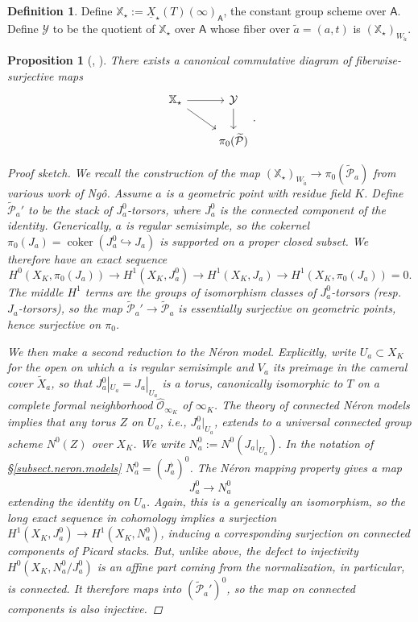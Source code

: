 \documentclass[openany]{amsbook}
\newtheorem{proposition}[theorem]{Proposition}
\theoremstyle{definition}
\newtheorem{definition}[theorem]{Definition}
\theoremstyle{remark}
\numberwithin{equation}{section}
\renewcommand{\O}{\mathcal{O}}
\newcommand{\cY}{\mathcal{Y}}
\newcommand{\cP}{\mathcal{P}}
\newcommand{\ul}[1]{\underline{#1}}
\newcommand{\coker}{\operatorname{coker}}
\renewcommand{\-}{\operatorname{-}}
\newcommand{\wtilde}[1]{\widetilde{#1}}
\newcommand{\ctP}{\widetilde{\cP}}
\newcommand{\bA}{\mathsf{A}}
\newcommand{\bX}{\mathbb{X}}
\begin{document}
\begin{definition}\label{def.Wa.coinvar.sheaf}
    Define $\bX_\star := \ul{X}_\star(T)(\infty)_{\bA}$, the constant group scheme over $\bA$. Define $\cY$ to be the quotient of $\bX_\star$ over $\bA$ whose fiber over $\wtilde{a} = (a,t)$ is $(\bX_\star)_{W_{\wtilde{a}}}$.
\end{definition}

\begin{proposition}[{{\cite[\S 5.5]{ngofl}, \cite[6.3-6.7]{ngoendo}}}]\label{prop.ngo.cpt.map}
     There exists a canonical commutative diagram of fiberwise-surjective maps
    $$
        \begin{tikzcd}[ampersand replacement=\&]
        \bX_\star \ar[r] \ar[dr]\& \cY \ar[d] \\
        \& \pi_0(\ctP)
        \end{tikzcd}.
    $$
    \begin{proof}[Proof sketch]
        We recall the construction of the map $(\bX_\star)_{W_{\wtilde{a}}} \to \pi_0(\ctP_a)$ from various work of Ng\^{o}. Assume $a$ is a geometric point with residue field $K$. Define $\ctP_a'$ to be the stack of $J_a^0$-torsors, where $J_a^0$ is the connected component of the identity. Generically, $a$ is regular semisimple, so the cokernel $\pi_0(J_a) = \coker(J_a^0 \hookrightarrow J_a)$ is supported on a proper closed subset. We therefore have an exact sequence
        $$
            H^0(X_K, \pi_0(J_a)) \to H^1(X_K, J_a^0) \to H^1(X_K, J_a) \to H^1(X_K, \pi_0(J_a)) = 0.
        $$
        The middle $H^1$ terms are the groups of isomorphism classes of $J_a^0$-torsors (resp. $J_a$-torsors), so the map $\ctP_a' \to \ctP_a$ is essentially surjective on geometric points, hence surjective on $\pi_0$. 
        
        We then make a second reduction to the N\'{e}ron model. Explicitly, write $U_a \subset X_K$ for the open on which $a$ is regular semisimple and $V_a$ its preimage in the cameral cover $\wtilde{X}_a$, so that $J_a^0|_{U_a} = J_a|_{U_a}$ is a torus, canonically isomorphic to $T$ on a complete formal neighborhood $\widehat{\O}_{\infty_K}$ of $\infty_K$. The theory of connected N\'{e}ron models implies that any torus $Z$ on $U_a$, i.e., $J_a^0|_{U_a}$, extends to a universal connected group scheme $N^0(Z)$ over $X_K$.
        We write $N_a^0 := N^0(J_a|_{U_a})$. In the notation of \S \ref{subsect.neron.models} $N_a^0 = (J^\flat_a)^0$. The N\'{e}ron mapping property gives a map
        $$
            J_a^0 \to N_a^0
        $$
        extending the identity on $U_a$. Again, this is a generically an isomorphism, so the long exact sequence in cohomology implies a surjection $H^1(X_K, J_a^0) \to H^1(X_K, N_a^0)$, inducing a corresponding surjection on connected components of Picard stacks. But, unlike above, the defect to injectivity $H^0(X_K, N_a^0/J_a^0)$ is an affine part coming from the normalization, in particular, is connected. It therefore maps into $(\ctP_a')^0$, so the map on connected components is also injective.


\end{proof}
\end{proposition}
\end{document}
